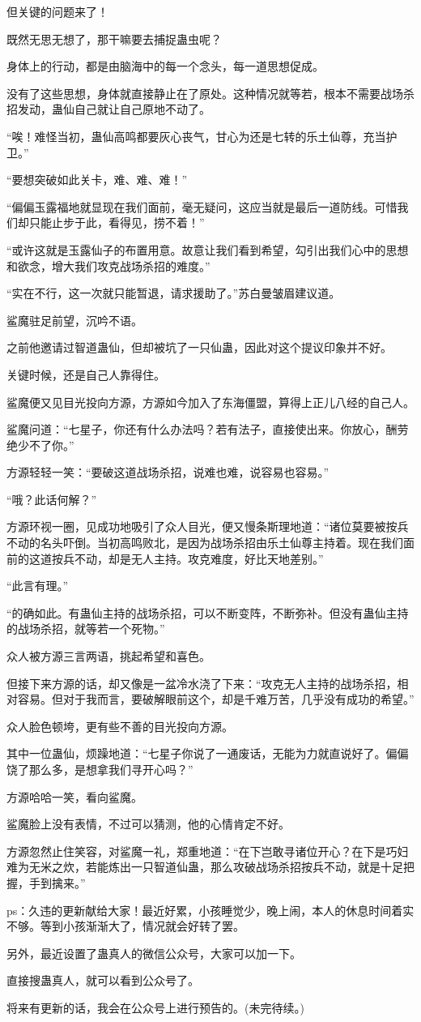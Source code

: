 \begin{this_body}
但关键的问题来了！

既然无思无想了，那干嘛要去捕捉蛊虫呢？

身体上的行动，都是由脑海中的每一个念头，每一道思想促成。

没有了这些思想，身体就直接静止在了原处。这种情况就等若，根本不需要战场杀招发动，蛊仙自己就让自己原地不动了。

“唉！难怪当初，蛊仙高鸣都要灰心丧气，甘心为还是七转的乐土仙尊，充当护卫。”

“要想突破如此关卡，难、难、难！”

“偏偏玉露福地就显现在我们面前，毫无疑问，这应当就是最后一道防线。可惜我们却只能止步于此，看得见，捞不着！”

“或许这就是玉露仙子的布置用意。故意让我们看到希望，勾引出我们心中的思想和欲念，增大我们攻克战场杀招的难度。”

“实在不行，这一次就只能暂退，请求援助了。”苏白曼皱眉建议道。

鲨魔驻足前望，沉吟不语。

之前他邀请过智道蛊仙，但却被坑了一只仙蛊，因此对这个提议印象并不好。

关键时候，还是自己人靠得住。

鲨魔便又见目光投向方源，方源如今加入了东海僵盟，算得上正儿八经的自己人。

鲨魔问道：“七星子，你还有什么办法吗？若有法子，直接使出来。你放心，酬劳绝少不了你。”

方源轻轻一笑：“要破这道战场杀招，说难也难，说容易也容易。”

“哦？此话何解？”

方源环视一圈，见成功地吸引了众人目光，便又慢条斯理地道：“诸位莫要被按兵不动的名头吓倒。当初高鸣败北，是因为战场杀招由乐土仙尊主持着。现在我们面前的这道按兵不动，却是无人主持。攻克难度，好比天地差别。”

“此言有理。”

“的确如此。有蛊仙主持的战场杀招，可以不断变阵，不断弥补。但没有蛊仙主持的战场杀招，就等若一个死物。”

众人被方源三言两语，挑起希望和喜色。

但接下来方源的话，却又像是一盆冷水浇了下来：“攻克无人主持的战场杀招，相对容易。但对于我而言，要破解眼前这个，却是千难万苦，几乎没有成功的希望。”

众人脸色顿垮，更有些不善的目光投向方源。

其中一位蛊仙，烦躁地道：“七星子你说了一通废话，无能为力就直说好了。偏偏饶了那么多，是想拿我们寻开心吗？”

方源哈哈一笑，看向鲨魔。

鲨魔脸上没有表情，不过可以猜测，他的心情肯定不好。

方源忽然止住笑容，对鲨魔一礼，郑重地道：“在下岂敢寻诸位开心？在下是巧妇难为无米之炊，若能炼出一只智道仙蛊，那么攻破战场杀招按兵不动，就是十足把握，手到擒来。”

ps：久违的更新献给大家！最近好累，小孩睡觉少，晚上闹，本人的休息时间着实不够。等到小孩渐渐大了，情况就会好转了罢。

另外，最近设置了蛊真人的微信公众号，大家可以加一下。

直接搜蛊真人，就可以看到公众号了。

将来有更新的话，我会在公众号上进行预告的。(未完待续。)

\end{this_body}

